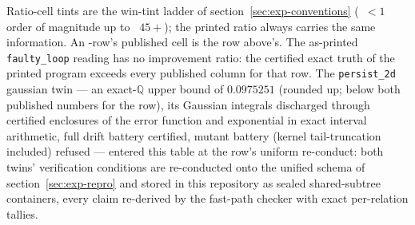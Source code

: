 \begin{table}[htbp]
\centering\small


\smallskip
\begin{minipage}{0.96\linewidth}\footnotesize
Ratio-cell tints are the win-tint ladder of
section~\ref{sec:exp-conventions} (~$<1$ order of magnitude
up to ~$45+$); the printed ratio always carries the same
information. An \altrow-row's published cell is the row above's. The
as-printed \texttt{faulty\_loop} reading has no improvement ratio: the
certified exact truth of the printed program exceeds every published
column for that row. The \texttt{persist\_2d} gaussian twin --- an
exact-$\mathbb{Q}$ upper bound of $0.0975251$ (rounded up; below both
published numbers for the row), its Gaussian integrals discharged
through certified enclosures of the error function and exponential in
exact interval arithmetic, full drift battery certified, mutant
battery (kernel tail-truncation included) refused --- entered this
table at the row's uniform re-conduct: both twins' verification
conditions are re-conducted onto the unified schema of
section~\ref{sec:exp-repro} and stored in this repository as sealed
shared-subtree containers, every claim re-derived by the fast-path
checker with exact per-relation tallies.
\end{minipage}
\caption{The published-table sweep, all rows. ``Best published'' is,
per row, the minimum over the paper's sound columns; our bounds are
certified exact-$\mathbb{Q}$ upper bounds on reach probability,
rounded up at the displayed digit.}
\label{tab:exp-sweep}
\end{table}

